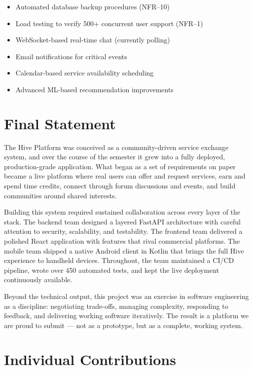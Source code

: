\documentclass[11pt,a4paper]{report}
\begin{document}
\begin{itemize}
    \item Automated database backup procedures (NFR--10)
    \item Load testing to verify 500+ concurrent user support (NFR--1)
    \item WebSocket-based real-time chat (currently polling)
    \item Email notifications for critical events
    \item Calendar-based service availability scheduling
    \item Advanced ML-based recommendation improvements
\end{itemize}

\section{Final Statement}

The Hive Platform was conceived as a community-driven service exchange system, and over the course of the semester it grew into a fully deployed, production-grade application. What began as a set of requirements on paper became a live platform where real users can offer and request services, earn and spend time credits, connect through forum discussions and events, and build communities around shared interests.

Building this system required sustained collaboration across every layer of the stack. The backend team designed a layered FastAPI architecture with careful attention to security, scalability, and testability. The frontend team delivered a polished React application with features that rival commercial platforms. The mobile team shipped a native Android client in Kotlin that brings the full Hive experience to handheld devices. Throughout, the team maintained a CI/CD pipeline, wrote over 450 automated tests, and kept the live deployment continuously available.

Beyond the technical output, this project was an exercise in software engineering as a discipline: negotiating trade-offs, managing complexity, responding to feedback, and delivering working software iteratively. The result is a platform we are proud to submit --- not as a prototype, but as a complete, working system.

\section{Individual Contributions}
\end{document}
